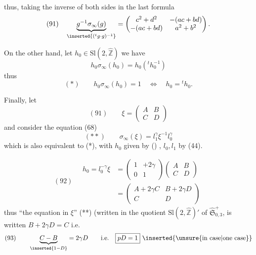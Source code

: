 
thus, taking the inverse of both sides in
the last formula
\[
(91)\quad \underbrace{g^{-1}\sigma_\infty(g)}_{\inserted{({}^t g\cdot g)^{-1}}}
=\begin{pmatrix}c^2+d^2&-(ac+bd)\\-(ac+bd)&a^2+b^2\end{pmatrix}.
\]

On the other hand, let
$h_0\in\mathrm{Sl}(2,\widehat{\mathbb Z})$
we have
\[
h_0\sigma_\infty(h_0)=h_0({}^t h_0^{-1})
\]
thus
\[
(*)\qquad h_0\sigma_\infty(h_0)=1\quad\Longleftrightarrow\quad h_0={}^t h_0.
\]

Finally, let
\[
(91)\qquad \xi=\begin{pmatrix}A&B\\C&D\end{pmatrix}
\]
and consider the equation (68)
\[
(**)\qquad \sigma_\infty(\xi)=l_1^\gamma\xi^{-1}l_0^\gamma
\]
which is also equivalent to (*), with $h_0$ given by ()
, $l_0,l_1$ by (44).


\[
(92)\quad\begin{aligned}
h_0=l_0^{-\gamma}\xi
&=\begin{pmatrix}1&+2\gamma\\0&1\end{pmatrix}
\begin{pmatrix}A&B\\C&D\end{pmatrix}\\
&=\begin{pmatrix}A+2\gamma C&B+2\gamma D\\C&D\end{pmatrix}
\end{aligned}
\]
thus ``the equation in $\xi$'' (**) (written in the
quotient $\mathrm{Sl}(2,\widehat{\mathbb Z})'$ of $\widehat{\mathfrak S}_{0,3}^{+}$, is written $B+2\gamma D=C$
i.e.
\[
(93)\qquad \underbrace{C-B}_{\inserted{1-D}}=2\gamma D
\qquad\text{i.e.}\quad\boxed{pD=1}\ \inserted{\text{\unsure{in case|one case}}}
\]

